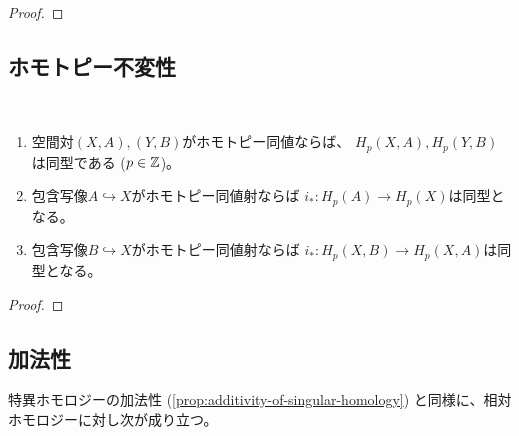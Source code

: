 \documentclass[report]{jlreq}
\begin{document}
\begin{proof}
    \TODO{}
\end{proof}

\begin{definition}[空間対の射から誘導されるチェイン写像]
\end{definition}

\subsection{ホモトピー不変性}

\begin{theorem}[相対ホモロジー群のホモトピー不変性]
    ~
    \begin{enumerate}
        \item 空間対$(X, A), (Y, B)$がホモトピー同値ならば、
            $H_p(X, A), H_p(Y, B)$は同型である ($p \in \mathbb{Z}$)。
        \item 包含写像$A \hookrightarrow X$がホモトピー同値射ならば
            $i_* \colon H_p(A) \to H_p(X)$は同型となる。
        \item 包含写像$B \hookrightarrow X$がホモトピー同値射ならば
            $i_* \colon H_p(X, B) \to H_p(X, A)$は同型となる。
    \end{enumerate}
\end{theorem}

\begin{proof}
    \TODO{}
\end{proof}

\subsection{加法性}

特異ホモロジーの加法性 (\cref{prop:additivity-of-singular-homology})
と同様に、相対ホモロジーに対し次が成り立つ。

\end{document}
